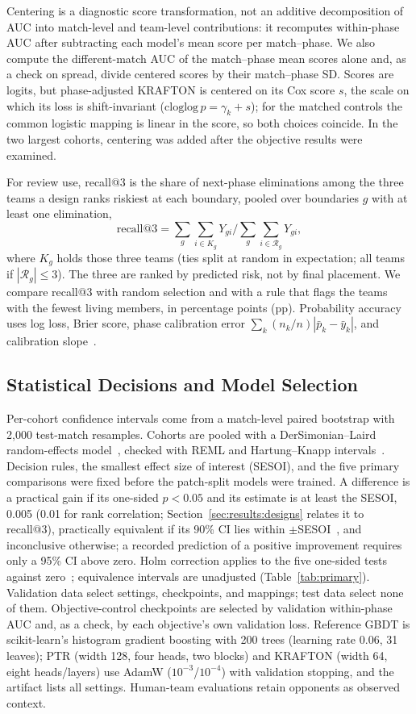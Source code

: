 \documentclass[sigconf,anonymous,nonacm]{acmart}
\begin{document}
Centering is a diagnostic score transformation, not an additive decomposition of AUC into match-level and team-level contributions: it recomputes within-phase AUC after subtracting each model's mean score per match--phase. We also compute the different-match AUC of the match--phase mean scores alone and, as a check on spread, divide centered scores by their match--phase SD. Scores are logits, but phase-adjusted KRAFTON is centered on its Cox score $s$, the scale on which its loss is shift-invariant ($\mathrm{cloglog}\,p=\gamma_k+s$); for the matched controls the common logistic mapping is linear in the score, so both choices coincide. In the two largest cohorts, centering was added after the objective results were examined.

For review use, recall@3 is the share of next-phase eliminations among the three teams a design ranks riskiest at each boundary, pooled over boundaries $g$ with at least one elimination,
\[
\mathrm{recall@3}=\sum_g\sum_{i\in K_g}Y_{gi}\Big/\sum_g\sum_{i\in\mathcal{R}_g}Y_{gi},
\]
where $K_g$ holds those three teams (ties split at random in expectation; all teams if $|\mathcal{R}_g|\le3$). The three are ranked by predicted risk, not by final placement. We compare recall@3 with random selection and with a rule that flags the teams with the fewest living members, in percentage points (pp). Probability accuracy uses log loss, Brier score, phase calibration error $\sum_k(n_k/n)|\bar p_k-\bar y_k|$, and calibration slope~\cite{VanCalster16}.

\subsection{Statistical Decisions and Model Selection}
Per-cohort confidence intervals come from a match-level paired bootstrap with 2,000 test-match resamples.
Cohorts are pooled with a DerSimonian--Laird random-effects model~\cite{DerSimonian86}, checked with REML and Hartung--Knapp intervals~\cite{HartungKnapp01}.
Decision rules, the smallest effect size of interest (SESOI), and the five primary comparisons were fixed before the patch-split models were trained. A difference is a practical gain if its one-sided $p<0.05$ and its estimate is at least the SESOI, 0.005 (0.01 for rank correlation; Section~\ref{sec:results:designs} relates it to recall@3), practically equivalent if its 90\% CI lies within $\pm$SESOI~\cite{Schuirmann87}, and inconclusive otherwise; a recorded prediction of a positive improvement requires only a 95\% CI above zero.
Holm correction applies to the five one-sided tests against zero~\cite{Holm79}; equivalence intervals are unadjusted (Table~\ref{tab:primary}).
Validation data select settings, checkpoints, and mappings; test data select none of them. Objective-control checkpoints are selected by validation within-phase AUC and, as a check, by each objective's own validation loss. Reference GBDT is scikit-learn's histogram gradient boosting with 200 trees (learning rate 0.06, 31 leaves); PTR (width 128, four heads, two blocks) and KRAFTON (width 64, eight heads/layers) use AdamW ($10^{-3}$/$10^{-4}$) with validation stopping, and the artifact lists all settings. Human-team evaluations retain opponents as observed context.
\end{document}
